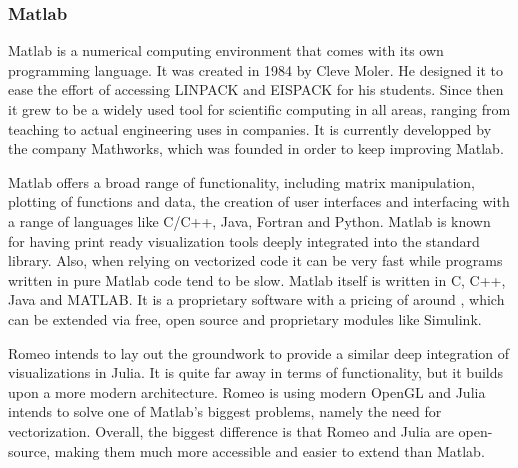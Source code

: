 \subsubsection{Matlab}

\ac{Matlab} is a numerical computing environment that comes with its own programming language.
It was created in 1984 by Cleve Moler. He designed it to ease the effort of accessing LINPACK and EISPACK for his students.
Since then it grew to be a widely used tool for scientific computing in all areas, ranging from teaching to actual engineering uses in companies. It is currently developped by the company Mathworks, which was founded in order to keep improving Matlab.

Matlab offers a broad range of functionality, including matrix manipulation, plotting of functions and data, the creation of user interfaces and interfacing with a range of languages like C/C++, Java, Fortran and Python. 
Matlab is known for having print ready visualization tools deeply integrated into the standard library.
Also, when relying on vectorized code it can be very fast while programs written in pure Matlab code tend to be slow.
\ac{Matlab} itself is written in C, C++, Java and MATLAB.
It is a proprietary software with a pricing of around \cite{MatlabPricing}, which can be extended via free, open source and proprietary modules like Simulink.

Romeo intends to lay out the groundwork to provide a similar deep integration of visualizations in Julia. 
It is quite far away in terms of functionality, but it builds upon a more modern architecture.
Romeo is using modern OpenGL and Julia intends to solve one of Matlab's biggest problems, namely the need for vectorization.
Overall, the biggest difference is that Romeo and Julia are open-source, making them much more accessible and easier to extend than Matlab.


